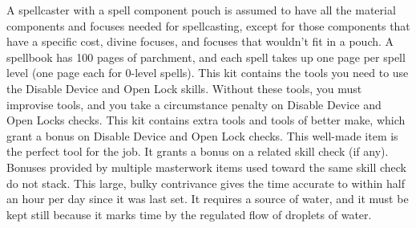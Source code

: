          A spellcaster with a spell component pouch is assumed to have all the material components and focuses needed for spellcasting, except for those components that have a specific cost, divine focuses, and focuses that wouldn't fit in a pouch.
         A spellbook has 100 pages of parchment, and each spell takes up one page per spell level (one page each for 0-level spells).
         This kit contains the tools you need to use the Disable Device and Open Lock skills. Without these tools, you must improvise tools, and you take a  circumstance penalty on Disable Device and Open Locks checks.
         This kit contains extra tools and tools of better make, which grant a  bonus on Disable Device and Open Lock checks.
         This well-made item is the perfect tool for the job. It grants a  bonus on a related skill check (if any). Bonuses provided by multiple masterwork items used toward the same skill check do not stack.
         This large, bulky contrivance gives the time accurate to within half an hour per day since it was last set. It requires a source of water, and it must be kept still because it marks time by the regulated flow of droplets of water.

